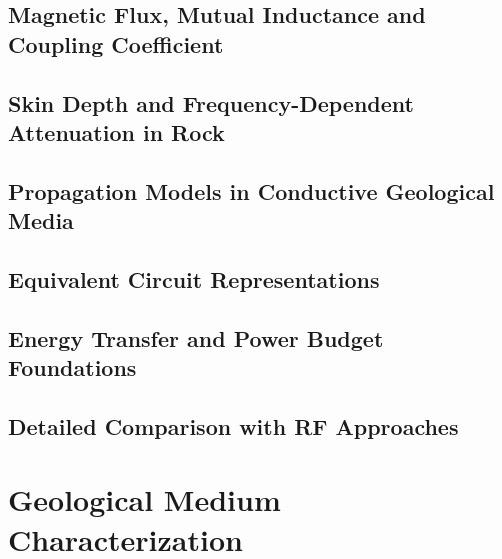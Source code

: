 \subsection{Magnetic Flux, Mutual Inductance and Coupling Coefficient}\label{subsec:mutual-inductance}

\subsection{Skin Depth and Frequency-Dependent Attenuation in Rock}\label{subsec:skin-depth}

\subsection{Propagation Models in Conductive Geological Media}\label{subsec:propagation-models}

\subsection{Equivalent Circuit Representations}\label{subsec:equivalent-circuit}

\subsection{Energy Transfer and Power Budget Foundations}\label{subsec:energy-transfer}

\subsection{Detailed Comparison with RF Approaches}\label{subsec:detailed-mi-rf-comparison}

\section{Geological Medium Characterization}\label{sec:geological-medium}
